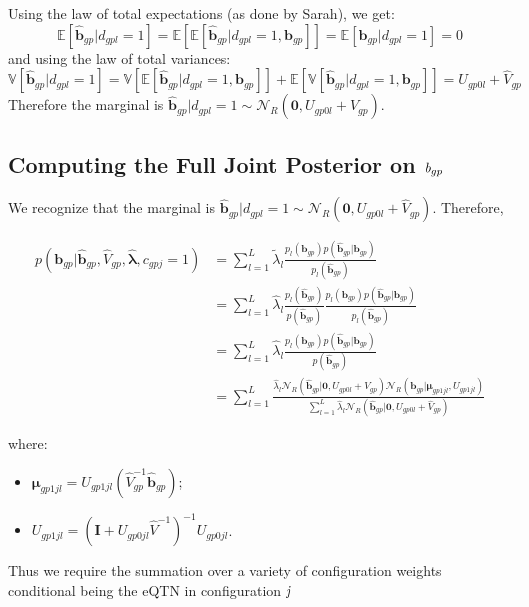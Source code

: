 \documentclass[10pt]{article}
\newcommand{\Exp}{\mathbb{E}} %
\newcommand{\Var}{\mathbb{V}} %
\newcommand{\Norm}{{\mathcal{N}}} %
\begin{document}
Using the law of total expectations (as done by Sarah), we get:
\begin{equation}
  \Exp[\hat{\bm{b}}_{gp} | d_{gpl}=1] = \Exp[\Exp[\hat{\bm{b}}_{gp} | d_{gpl}=1, \bm{b}_{gp}]] = \Exp[\bm{b}_{gp} | d_{gpl}=1] = 0
\end{equation}
and using the law of total variances:
\begin{equation}
  \Var[\hat{\bm{b}}_{gp} | d_{gpl}=1] = \Var[\Exp[\hat{\bm{b}}_{gp} | d_{gpl}=1, \bm{b}_{gp}]] + \Exp[\Var[\hat{\bm{b}}_{gp} | d_{gpl}=1, \bm{b}_{gp}]] = U_{gp0l} + \hat{V}_{gp}
\end{equation}
Therefore the marginal is $\hat{\bm{b}}_{gp} | d_{gpl}=1 \sim \Norm_R(\bm{0}, U_{gp0l} + \hat{V}_{gp})$.

\subsection{Computing the Full Joint Posterior on $\emph{b}_{gp}$}

We recognize that the marginal is $\hat{\bm{b}}_{gp} | d_{gpl}=1 \sim \Norm_R(\bm{0}, U_{gp0l} + \hat{V}_{gp})$.
Therefore, 

\begin{equation}
  \begin{aligned} 
  p(\bm{b}_{gp} | \hat{\bm{b}}_{gp}, \hat{V}_{gp}, \hat{\bm{\lambda}}, c_{gpj}=1)  &= \sum_{l=1}^L \tilde{\lambda}_l \frac{p_l(\bm{b}_{gp}) p(\hat{\bm{b}}_{gp} | \bm{b}_{gp})}{p_l(\hat{\bm{b}}_{gp})}\\
      &= \sum_{l=1}^L \hat{\lambda}_l \frac{p_l(\hat{\bm{b}}_{gp})}{p(\hat{\bm{b}}_{gp})} \frac{p_l(\bm{b}_{gp}) p(\hat{\bm{b}}_{gp} | \bm{b}_{gp})}{p_l(\hat{\bm{b}}_{gp})}\\
      &= \sum_{l=1}^L \hat{\lambda}_l \frac{p_l(\bm{b}_{gp}) p(\hat{\bm{b}}_{gp} | \bm{b}_{gp})}{{p(\hat{\bm{b}}_{gp})}} \\
      &=  \sum_{l=1}^L \frac {\hat{\lambda}_l  \Norm_R(\hat{\bm{b}}_{gp}|\bm{0}, U_{gp0l} + \hat{V}_{gp})  \Norm_R(\bm{b}_{gp}|\bm{\mu}_{gp1jl}, U_{gp1jl})} {\sum_{l=1}^L \hat{\lambda}_l \Norm_R(\hat{\bm{b}}_{gp}|\bm{0}, U_{gp0l} + \hat{V}_{gp})}
       \end{aligned} 
       \end{equation}
 
where:
\begin{itemize}
\item $\bm{\mu}_{gp1jl} = U_{gp1jl} (\hat{V}_{gp}^{-1} \hat{\bm{b}}_{gp})$;
\item $U_{gp1jl} = (\mathbf{I} +U_{gp0jl} \hat{V}^{-1})^{-1} U_{gp0jl}$.


\end{itemize}

Thus we require the summation over a variety of configuration weights conditional being the eQTN in configuration $\emph{j}$

\end{document}

